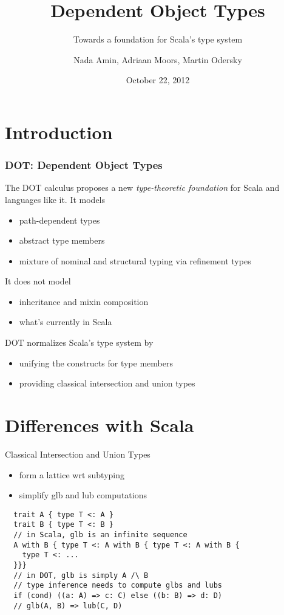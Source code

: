 \documentclass{beamer}
\title{Dependent Object Types}
\subtitle{Towards a foundation for Scala's type system}
\author{Nada Amin, Adriaan Moors, Martin Odersky}
\institute{FOOL 2012}
\date{October 22, 2012}
\begin{document}
\frame{\titlepage}

\section{Introduction}

\begin{frame}
\frametitle{DOT: Dependent Object Types}

The DOT calculus proposes a new \emph{type-theoretic foundation} for Scala
and languages like it. It models
\begin{itemize}
\item path-dependent types
\item abstract type members
\item mixture of nominal and structural typing via refinement types
\end{itemize}

It does not model
\begin{itemize}
\item inheritance and mixin composition
\item what's currently in Scala
\end{itemize}

DOT normalizes Scala's type system by
\begin{itemize}
\item unifying the constructs for type members
\item providing classical intersection and union types
\end{itemize}

\end{frame}

\section{Differences with Scala}

\begin{frame}[fragile]{Classical Intersection and Union Types}
\begin{itemize}
\item form a lattice wrt subtyping
\item simplify glb and lub computations
\end{itemize}
\begin{verbatim}
  trait A { type T <: A }
  trait B { type T <: B }
  // in Scala, glb is an infinite sequence
  A with B { type T <: A with B { type T <: A with B {
    type T <: ...
  }}}
  // in DOT, glb is simply A /\ B
  // type inference needs to compute glbs and lubs
  if (cond) ((a: A) => c: C) else ((b: B) => d: D)
  // glb(A, B) => lub(C, D)
\end{verbatim}

\end{frame}
\end{document}
